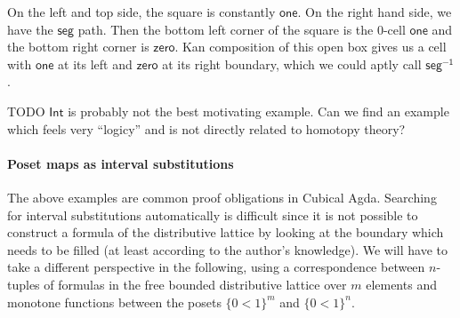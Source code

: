 \documentclass[11pt]{article}
\theoremstyle{definition}
\newcommand{\todo}[1]{
  \begin{tcolorbox}
    TODO {#1} 
  \end{tcolorbox}
}
\newcommand{\cset}[1]{\ensuremath{\mathsf{{#1}}}}
\begin{document}
On the left and top side, the square is constantly \cset{one}. On the right hand
side, we have the \cset{seg} path. Then the bottom left corner of the square is
the 0-cell \cset{one} and the bottom right corner is \cset{zero}.
Kan composition of this open box gives us a cell with \cset{one} at its
left and \cset{zero} at its right boundary, which we could aptly call \cset{seg^{-1}}.


\todo{\cset{Int} is probably not the best motivating example. Can we find an example
  which feels very ``logicy'' and is not directly related to homotopy theory?}

\paragraph{Poset maps as interval substitutions}

The above examples are common proof obligations in Cubical Agda. Searching for
interval substitutions automatically is difficult since it is not possible to
construct a formula of the distributive lattice by looking at the boundary which
needs to be filled (at least according to the author's knowledge). We 
will have to take a different perspective in the following, using a
correspondence between $n$-tuples of formulas in the free bounded distributive
lattice over $m$ elements and monotone
functions between the posets  $\{ 0<1 \}^m$ and $\{ 0<1 \}^n$.

\end{document}
